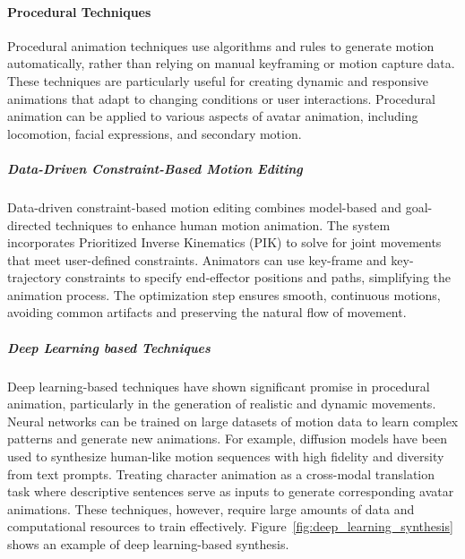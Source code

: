 \documentclass[../../main.tex]{subfiles}
\begin{document}
\paragraph{Procedural Techniques}
\label{ch:background_work:sign_language_synthesis:3d_techniques:avatar_animation:procedural_techniques}

Procedural animation techniques use algorithms and rules to generate motion automatically, rather than relying on manual keyframing or motion capture data. These techniques are particularly useful for creating dynamic and responsive animations that adapt to changing conditions or user interactions. Procedural animation can be applied to various aspects of avatar animation, including locomotion, facial expressions, and secondary motion.

\subparagraph{Data-Driven Constraint-Based Motion Editing}
\label{ch:background_work:sign_language_synthesis:3d_techniques:avatar_animation:procedural_techniques:data_driven_constraint_based_motion_editing}

Data-driven constraint-based motion editing\cite{inbook} combines model-based and goal-directed techniques to enhance human motion animation. The system incorporates Prioritized Inverse Kinematics (PIK) to solve for joint movements that meet user-defined constraints. Animators can use key-frame and key-trajectory constraints to specify end-effector positions and paths, simplifying the animation process. The optimization step ensures smooth, continuous motions, avoiding common artifacts and preserving the natural flow of movement.

\subparagraph{Deep Learning based Techniques}
\label{ch:background_work:sign_language_synthesis:3d_techniques:avatar_animation:procedural_techniques:deep_learning_based_techniques}

Deep learning-based techniques have shown significant promise in procedural animation, particularly in the generation of realistic and dynamic movements. Neural networks can be trained on large datasets of motion data to learn complex patterns and generate new animations. For example, diffusion models have been used to synthesize human-like motion sequences with high fidelity and diversity from text prompts. Treating character animation as a cross-modal translation task where descriptive sentences serve as inputs to generate corresponding avatar animations. These techniques, however, require large amounts of data and computational resources to train effectively. Figure~\ref{fig:deep_learning_synthesis} shows an example of deep learning-based synthesis.
\end{document}
